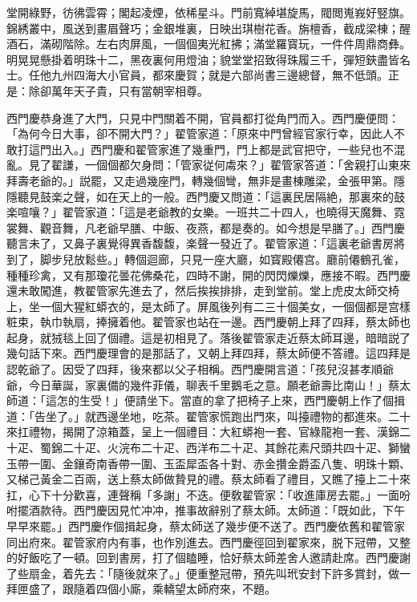 \begin{myquote}
堂開綠野，彷彿雲霄；閣起凌煙，依稀星斗。門前寬綽堪旋馬，閥閲嵬峩好竪旗。錦綉叢中，風送到畫眉聲巧；金銀堆裏，日映出琪樹花香。旃檀香，截成梁棟；醒酒石，滿砌階除。左右肉屏風，一個個夷光紅拂；滿堂羅寳玩，一件件周鼎商彝。明晃晃懸掛着明珠十二，黑夜裏何用燈油；貌堂堂招致得珠履三千，彈短鋏盡皆名士。任他九州四海大小官員，都來慶賀；就是六部尚書三邊總督，無不低頭。正是：除卻萬年天子貴，只有當朝宰相尊。
\end{myquote}

西門慶恭身進了大門，只見中門關着不開，官員都打從角門而入。西門慶便問：「為何今日大事，卻不開大門？」翟管家道：「原來中門曾經官家行幸，因此人不敢打這門出入。」西門慶和翟管家進了幾重門，門上都是武官把守，一些兒也不混亂。見了翟謙，一個個都欠身問：「管家従何䖏來？」翟管家答道：「舍親打山東來拜壽老爺的。」説罷，又走過幾座門，轉幾個彎，無非是畫棟雕梁，金張甲第。隱隱聽見鼓楽之聲，如在天上的一般。西門慶又問道：「這裏民居隔絶，那裏來的鼓楽喧嚷？」翟管家道：「這是老爺教的女樂。一班共二十四人，也曉得天魔舞、霓裳舞、觀音舞，凡老爺早膳、中飯、夜燕，都是奏的。如今想是早膳了。」西門慶聽言未了，又鼻子裏覺得異香馥馥，楽聲一發近了。翟管家道：「這裏老爺書房將到了，脚步兒放鬆些。」轉個迴廊，只見一座大廳，如寳殿僊宫。廳前僊鶴孔雀，種種珍禽，又有那瓊花曇花佛桑花，四時不謝，開的閃閃爍爍，應接不暇。西門慶還未敢闖進，教翟管家先進去了，然后挨挨排排，走到堂前。堂上虎皮太師交椅上，坐一個大猩紅蟒衣的，是太師了。屏風後列有二三十個美女，一個個都是宫樣粧束，執巾執扇，捧擁着他。翟管家也站在一邊。西門慶朝上拜了四拜，蔡太師也起身，就狨毯上回了個禮。這是初相見了。落後翟管家走近蔡太師耳邊，暗暗説了幾句話下來。西門慶理會的是那話了，又朝上拜四拜，蔡太師便不答禮。這四拜是認乾爺了。因受了四拜，後來都以父子相稱。西門慶開言道：「孩兒沒甚孝順爺爺，今日華誕，家裏備的幾件菲儀，聊表千里鵝毛之意。願老爺壽比南山！」蔡太師道：「這怎的生受！」便請坐下。當直的拿了把椅子上來，西門慶朝上作了個揖道：「告坐了。」就西邊坐地，吃茶。翟管家慌跑出門來，叫擡禮物的都進來。二十來扛禮物，揭開了涼箱蓋，呈上一個禮目：大紅蟒袍一套、官綠龍袍一套、漢錦二十疋、蜀錦二十疋、火浣布二十疋、西洋布二十疋、其餘花素尺頭共四十疋、獅蠻玉帶一圍、金鑲奇南香帶一圍、玉盃犀盃各十對、赤金攢金爵盃八隻、明珠十顆、又梯己黃金二百兩，送上蔡太師做贄見的禮。蔡太師看了禮目，又瞧了擡上二十來扛，心下十分歡喜，連聲稱「多謝」不迭。便敎翟管家：「收進庫房去罷。」一面吩咐擺酒款待。西門慶因見忙冲冲，推事故辭别了蔡太師。太師道：「既如此，下午早早來罷。」西門慶作個揖起身，蔡太師送了幾步便不送了。西門慶依舊和翟管家同出府來。翟管家府内有事，也作別進去。西門慶徑回到翟家來，脱下冠帶，又整的好飯吃了一頓。回到書房，打了個瞌睡，恰好蔡太師差舍人邀請赴席。西門慶謝了些扇金，着先去：「隨後就來了。」便重整冠帶，預先叫玳安封下許多賞封，做一拜匣盛了，跟隨着四個小廝，乘轎望太師府來，不題。


